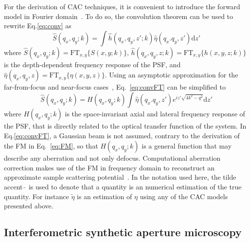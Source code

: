 For the derivation of CAC techniques, it is convenient to introduce the forward model in Fourier domain~\cite{Liu2017_Computational}. To do so, the convolution theorem can be used to rewrite Eq.\eqref{eq:conv} as
\begin{equation}\label{eq:convFT}
    \hat{S}(q_x, q_y; k) = \int \hat{h}(q_x, q_y, z'; k) \hat{\eta}(q_x. q_y, z') \text{d}z'
\end{equation}
where $\hat{S}(q_x, q_y; k)=\text{FT}_{x,y}\{S(x,y;k)\}$, $\hat{h}(q_x, q_y, z; k)=\text{FT}_{x,y}\{h(x,y,z;k)\}$ is the depth-dependent frequency response of the PSF, and $\hat{\eta}(q_x, q_y, z)=\text{FT}_{x,y}\{\eta(x,y,z)\}$. Using an asymptotic approximation for the far-from-focus and near-focus cases~\cite{Davis2007_Nonparaxial}, Eq.~\eqref{eq:convFT} can be simplified to
\begin{equation}\label{eq:FMft}
    \hat{S}(q_x, q_y; k) = H(q_x, q_y; k) \int \hat{\eta}(q_x. q_y, z') e^{iz'\sqrt{4k^2-q^2}} \text{d}z'
\end{equation}
where $H(q_x, q_y; k)$ is the space-invariant axial and lateral frequency response of the PSF, that is directly related to the optical transfer function of the system. In Eq.\eqref{eq:convFT}, a Gaussian beam is not assumed, contrary to the derivation of the FM in Eq.~\eqref{eq:FM}, so that $H(q_x, q_y; k)$ is a general function that may describe any aberration and not only defocus. Computational aberration correction makes use of the FM in frequency domain to reconstruct an approximate sample scattering potential~\cite{Liu2017_Computational}. In the notation used here, the tilde accent $\tilde{\ }$ is used to denote that a quantity is an numerical estimation of the true quantity. For instance $\tilde{\eta}$ is an estimation of $\eta$ using any of the CAC models presented above.

\subsection{Interferometric synthetic aperture microscopy}

